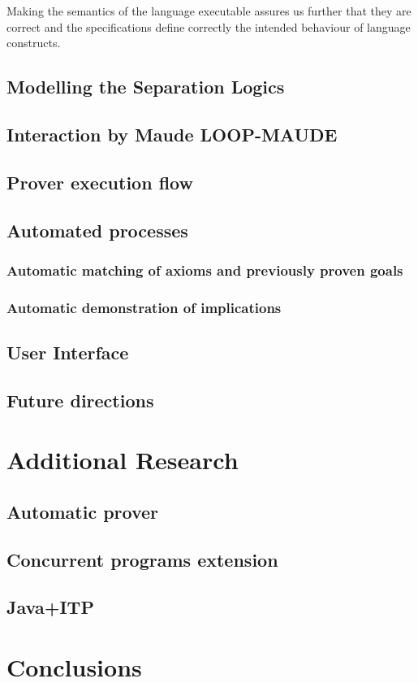 \documentclass[12pt,a4paper]{article}
\begin{document}
Making the semantics of the language executable assures us further that they are correct and the specifications define correctly the intended behaviour of language constructs.
\subsection{Modelling the Separation Logics}
\subsection{Interaction by Maude LOOP-MAUDE}
\subsection{Prover execution flow}
\subsection{Automated processes}
\subsubsection{Automatic matching of axioms and previously proven goals}
\subsubsection{Automatic demonstration of implications}
\subsection{User Interface}
\subsection{Future directions}
\section{Additional Research}
\subsection{Automatic prover}
\subsection{Concurrent programs extension}
\subsection{Java+ITP}

\section{Conclusions}
\pagebreak


\end{document}
